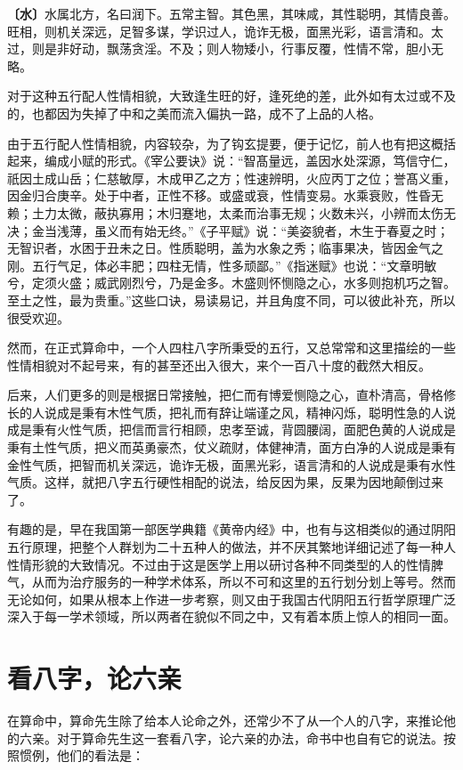\documentclass[a5paper,oneside,12pt]{ctexbook}
\begin{document}
\textbf{〔水〕}水属北方，名曰润下。五常主智。其色黑，其味咸，其性聪明，其情良善。旺相，则机关深远，足智多谋，学识过人，诡诈无极，面黑光彩，语言清和。太过，则是非好动，飘荡贪淫。不及；则人物矮小，行事反覆，性情不常，胆小无略。

对于这种五行配人性情相貌，大致逢生旺的好，逢死绝的差，此外如有太过或不及的，也都因为失掉了中和之美而流入偏执一路，成不了上品的人格。

由于五行配人性情相貌，内容较杂，为了钩玄提要，便于记忆，前人也有把这概括起来，编成小赋的形式。《宰公要诀》说：“智髙量远，盖因水处深源，笃信守仁，祇因土成山岳；仁慈敏厚，木成甲乙之方；性速辨明，火应丙丁之位；誉髙义重，因金归合庚辛。处于中者，正性不移。或盛或衰，性情变易。水乘衰败，性昏无赖；土力太微，蔽执寡用；木归蹇地，太柔而治事无规；火数未兴，小辨而太伤无决；金当浅薄，虽义而有始无终。”《子平赋》说：“美姿貌者，木生于春夏之时；无智识者，水困于丑未之日。性质聪明，盖为水象之秀；临事果决，皆因金气之刚。五行气足，体必丰肥；四柱无情，性多顽鄙。”《指迷赋》也说：“文章明敏兮，定须火盛；威武刚烈兮，乃是金多。木盛则怀恻隐之心，水多则抱机巧之智。至土之性，最为贵重。”这些口诀，易读易记，并且角度不同，可以彼此补充，所以很受欢迎。

然而，在正式算命中，一个人四柱八字所秉受的五行，又总常常和这里描绘的一些性情相貌对不起号来，有的甚至还出入很大，来个一百八十度的截然大相反。

后来，人们更多的则是根据日常接触，把仁而有博爱恻隐之心，直朴清高，骨格修长的人说成是秉有木性气质，把礼而有辞让端谨之风，精神闪烁，聪明性急的人说成是秉有火性气质，把信而言行相顾，忠孝至诚，背圆腰阔，面肥色黄的人说成是秉有土性气质，把义而英勇豪杰，仗义疏财，体健神清，面方白净的人说成是秉有金性气质，把智而机关深远，诡诈无极，面黑光彩，语言清和的人说成是秉有水性气质。这样，就把八字五行硬性相配的说法，给反因为果，反果为因地颠倒过来了。

有趣的是，早在我国第一部医学典籍《黄帝内经》中，也有与这相类似的通过阴阳五行原理，把整个人群划为二十五种人的做法，并不厌其繁地详细记述了每一种人性情形貌的大致情况。不过由于这是医学上用以研讨各种不同类型的人的性情脾气，从而为治疗服务的一种学术体系，所以不可和这里的五行划分划上等号。然而无论如何，如果从根本上作进一步考察，则又由于我国古代阴阳五行哲学原理广泛深入于每一学术领域，所以两者在貌似不同之中，又有着本质上惊人的相同一面。

\section{看八字，论六亲}

在算命中，算命先生除了给本人论命之外，还常少不了从一个人的八字，来推论他的六亲。对于算命先生这一套看八字，论六亲的办法，命书中也自有它的说法。按照惯例，他们的看法是：
\end{document}
